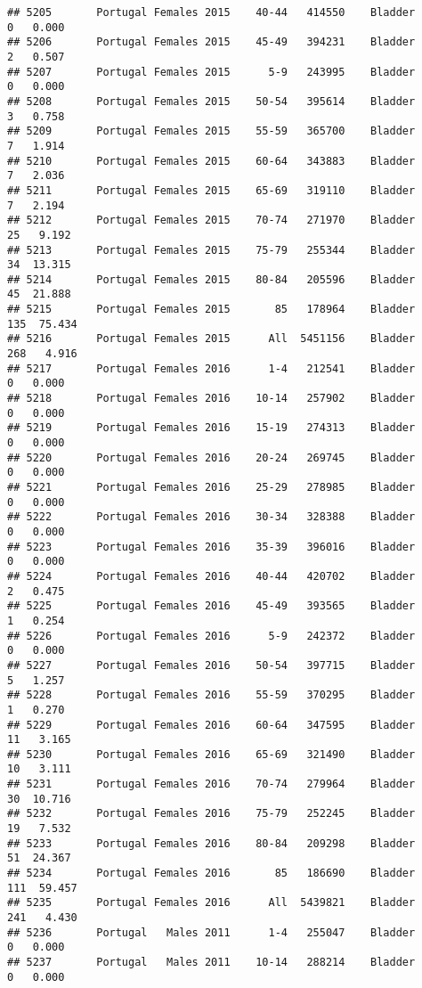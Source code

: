\documentclass[
]{article}
\begin{document}
\begin{verbatim}
## 5205       Portugal Females 2015    40-44   414550    Bladder      0   0.000
## 5206       Portugal Females 2015    45-49   394231    Bladder      2   0.507
## 5207       Portugal Females 2015      5-9   243995    Bladder      0   0.000
## 5208       Portugal Females 2015    50-54   395614    Bladder      3   0.758
## 5209       Portugal Females 2015    55-59   365700    Bladder      7   1.914
## 5210       Portugal Females 2015    60-64   343883    Bladder      7   2.036
## 5211       Portugal Females 2015    65-69   319110    Bladder      7   2.194
## 5212       Portugal Females 2015    70-74   271970    Bladder     25   9.192
## 5213       Portugal Females 2015    75-79   255344    Bladder     34  13.315
## 5214       Portugal Females 2015    80-84   205596    Bladder     45  21.888
## 5215       Portugal Females 2015       85   178964    Bladder    135  75.434
## 5216       Portugal Females 2015      All  5451156    Bladder    268   4.916
## 5217       Portugal Females 2016      1-4   212541    Bladder      0   0.000
## 5218       Portugal Females 2016    10-14   257902    Bladder      0   0.000
## 5219       Portugal Females 2016    15-19   274313    Bladder      0   0.000
## 5220       Portugal Females 2016    20-24   269745    Bladder      0   0.000
## 5221       Portugal Females 2016    25-29   278985    Bladder      0   0.000
## 5222       Portugal Females 2016    30-34   328388    Bladder      0   0.000
## 5223       Portugal Females 2016    35-39   396016    Bladder      0   0.000
## 5224       Portugal Females 2016    40-44   420702    Bladder      2   0.475
## 5225       Portugal Females 2016    45-49   393565    Bladder      1   0.254
## 5226       Portugal Females 2016      5-9   242372    Bladder      0   0.000
## 5227       Portugal Females 2016    50-54   397715    Bladder      5   1.257
## 5228       Portugal Females 2016    55-59   370295    Bladder      1   0.270
## 5229       Portugal Females 2016    60-64   347595    Bladder     11   3.165
## 5230       Portugal Females 2016    65-69   321490    Bladder     10   3.111
## 5231       Portugal Females 2016    70-74   279964    Bladder     30  10.716
## 5232       Portugal Females 2016    75-79   252245    Bladder     19   7.532
## 5233       Portugal Females 2016    80-84   209298    Bladder     51  24.367
## 5234       Portugal Females 2016       85   186690    Bladder    111  59.457
## 5235       Portugal Females 2016      All  5439821    Bladder    241   4.430
## 5236       Portugal   Males 2011      1-4   255047    Bladder      0   0.000
## 5237       Portugal   Males 2011    10-14   288214    Bladder      0   0.000

\end{verbatim}
\end{document}
